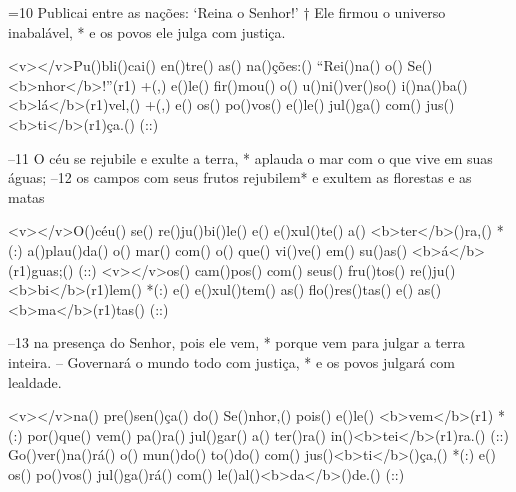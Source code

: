 =10 Publicai entre as nações: ‘Reina o Senhor!’ † 
Ele firmou o universo inabalável, * 
e os povos ele julga com justiça.

<v></v>Pu()bli()cai() en()tre() as() na()ções:() ``Rei()na() o() Se()<b>nhor</b>!''(r1) +(,)
e()le() fir()mou() o() u()ni()ver()so() i()na()ba()<b>lá</b>(r1)vel,() +(,)
e() os() po()vos() e()le() jul()ga() com() jus()<b>ti</b>(r1)ça.() (::)

–11 O céu se rejubile e exulte a terra, * 
aplauda o mar com o que vive em suas águas;
–12 os campos com seus frutos rejubilem* 
e exultem as florestas e as matas

<v></v>O()céu() se() re()ju()bi()le() e() e()xul()te() a() <b>ter</b>()ra,() *(:)
a()plau()da() o() mar() com() o() que() vi()ve() em() su()as() <b>á</b>(r1)guas;() (::)
<v></v>os() cam()pos() com() seus() fru()tos() re()ju()<b>bi</b>(r1)lem() *(:)
e() e()xul()tem() as() flo()res()tas() e() as() <b>ma</b>(r1)tas() (::)

–13 na presença do Senhor, pois ele vem, * 
porque vem para julgar a terra inteira.
– Governará o mundo todo com justiça, * 
e os povos julgará com lealdade.

<v></v>na() pre()sen()ça() do() Se()nhor,() pois() e()le() <b>vem</b>(r1) *(:)
por()que() vem() pa()ra() jul()gar() a() ter()ra() in()<b>tei</b>(r1)ra.() (::)
Go()ver()na()rá() o() mun()do() to()do() com() jus()<b>ti</b>()ça,() *(:)
e() os() po()vos() jul()ga()rá() com() le()al()<b>da</b>()de.() (::)